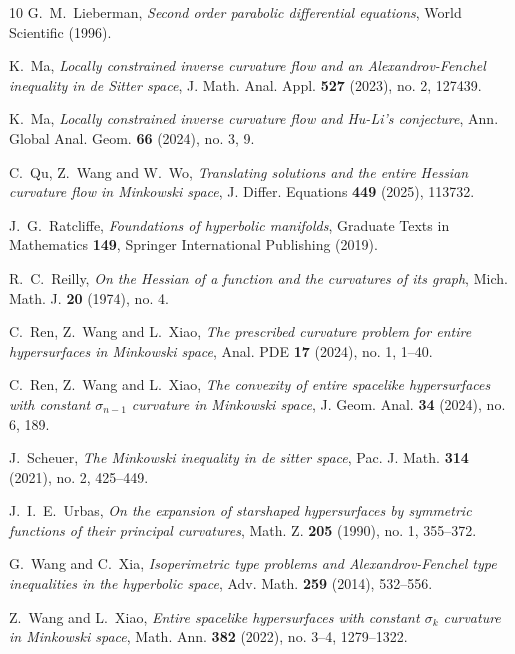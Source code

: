 \documentclass[reqno]{amsart}
\theoremstyle{remark}
\theoremstyle{definition}
\numberwithin{equation}{section}
\begin{document}
\begin{thebibliography}{10}
 G.~M.~Lieberman, {\em Second order parabolic differential equations}, World Scientific (1996).

 K.~Ma, {\em Locally constrained inverse curvature flow and an Alexandrov-Fenchel inequality in de Sitter space}, J. Math. Anal. Appl. {\bf 527} (2023), no. 2, 127439.

 K.~Ma, {\em Locally constrained inverse curvature flow and Hu-Li's conjecture}, Ann. Global Anal. Geom. {\bf 66} (2024), no. 3, 9.

 C.~Qu, Z.~Wang and W.~Wo, {\em Translating solutions and the entire Hessian curvature flow in Minkowski space}, J. Differ. Equations {\bf 449} (2025), 113732.

 J.~G.~Ratcliffe, {\em Foundations of hyperbolic manifolds}, Graduate Texts in Mathematics {\bf 149}, Springer International Publishing (2019).

 R.~C.~Reilly, {\em On the Hessian of a function and the curvatures of its graph}, Mich. Math. J. {\bf 20} (1974), no. 4.

 C.~Ren, Z.~Wang and L.~Xiao, {\em The prescribed curvature problem for entire hypersurfaces in Minkowski space}, Anal. PDE {\bf 17} (2024), no. 1, 1--40.

 C.~Ren, Z.~Wang and L.~Xiao, {\em The convexity of entire spacelike hypersurfaces with constant $\sigma_{n-1}$ curvature in Minkowski space}, J. Geom. Anal. {\bf 34} (2024), no. 6, 189.

 J.~Scheuer, {\em The Minkowski inequality in de sitter space}, Pac. J. Math. {\bf 314} (2021), no. 2, 425--449.


 J.~I.~E.~Urbas, {\em On the expansion of starshaped hypersurfaces by symmetric functions of their principal curvatures}, Math. Z. {\bf 205} (1990), no. 1, 355--372.

 G.~Wang and C.~Xia, {\em Isoperimetric type problems and Alexandrov-Fenchel type inequalities in the hyperbolic space}, Adv. Math. {\bf 259} (2014), 532--556.

 Z.~Wang and L.~Xiao, {\em Entire spacelike hypersurfaces with constant $\sigma_k$ curvature in Minkowski space}, Math. Ann. {\bf 382} (2022), no. 3--4, 1279--1322.


\end{thebibliography}
\end{document}
